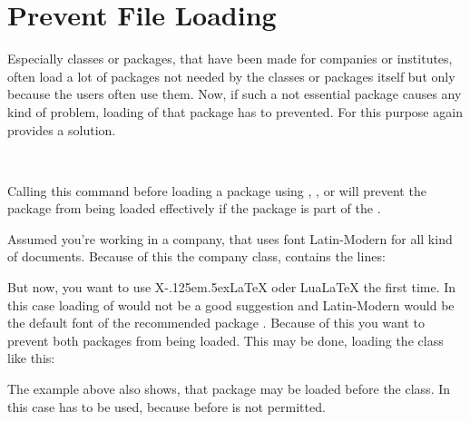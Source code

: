 \section{Prevent File Loading}

Especially classes or packages, that have
been made for companies or institutes, often load a lot of packages not needed
by the classes or packages itself but only because the users often use
them. Now, if such a not essential package causes any kind of problem, loading
of that package has to prevented. For this purpose  again
provides a solution.

\begin{Declaration}
  \\
\end{Declaration}
%
%
Calling this command before loading a
package using ,
, or
 will
prevent the package from being loaded effectively if the package is part of
the .
%
\begin{Example}
  Assumed you're working in a company, that uses font Latin-Modern for all
  kind of documents. Because of this the company class, 
  contains the lines:
\begin{lstcode}
  \RequirePackage[T1]{fontenc}
  \RequirePackage{lmodern}
\end{lstcode}
  But now, you want to use
  X\kern-.125em\lower.5ex\hbox{}\LaTeX{} oder Lua\LaTeX{} the
  first time. In this case loading of  would not be a good
  suggestion and Latin-Modern would be the default font of the recommended
  package . Because of this you want to prevent both
  packages from being loaded. This may be done, loading the class like this:
\end{Example}
The example above also shows, that package  may be loaded
before the class. In this case 
has to be used, because  before  is not
permitted.

